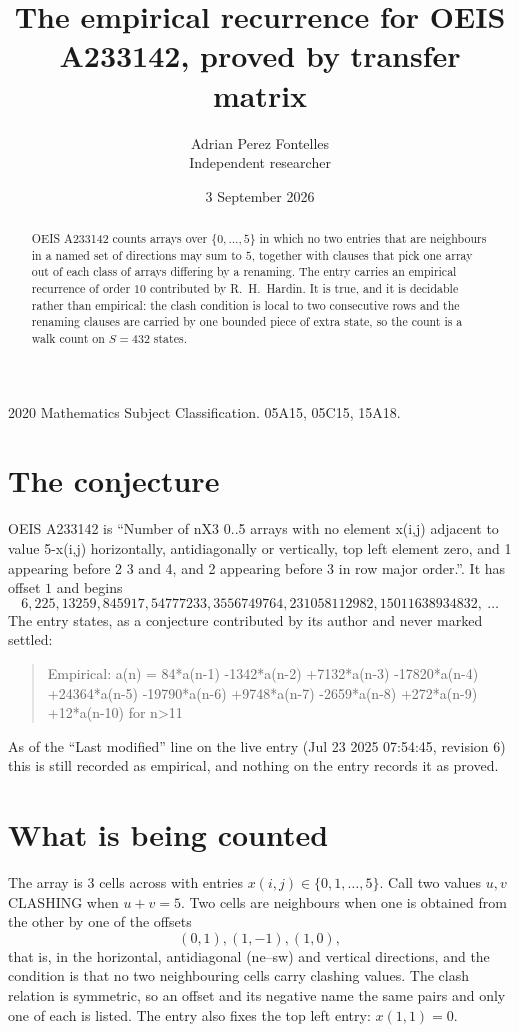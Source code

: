 \documentclass[11pt,a4paper]{article}
\title{The empirical recurrence for OEIS A233142, proved by transfer matrix}
\author{Adrian Perez Fontelles\\ \small Independent researcher}
\date{3 September 2026}
\theoremstyle{plain}
\theoremstyle{definition}
\begin{document}
\maketitle

\begin{abstract}
OEIS A233142 counts arrays over $\{0,\dots,5\}$ in which no two entries that are neighbours in
a named set of directions may sum to $5$, together with clauses that pick one array out of
each class of arrays differing by a renaming. The entry carries an empirical recurrence of
order $10$ contributed by R.~H.~Hardin. It is true, and it is decidable rather than
empirical: the clash condition is local to two consecutive rows and the renaming clauses are
carried by one bounded piece of extra state, so the count is a walk count on $S=432$ states.
\end{abstract}

\noindent\small 2020 Mathematics Subject Classification. 05A15, 05C15, 15A18.\normalsize

\section{The conjecture}

OEIS A233142 is ``Number of nX3 0..5 arrays with no element x(i,j) adjacent to value 5-x(i,j) horizontally, antidiagonally or vertically, top left element zero, and 1 appearing before 2 3 and 4, and 2 appearing before 3 in row major order.''. It has offset $1$ and begins
\[
6, 225, 13259, 845917, 54777233, 3556749764, 231058112982, 15011638934832,\ \dots
\]
The entry states, as a conjecture contributed by its author and never marked settled:
\begin{quote}
Empirical: a(n) = 84*a(n-1) -1342*a(n-2) +7132*a(n-3) -17820*a(n-4) +24364*a(n-5) -19790*a(n-6) +9748*a(n-7) -2659*a(n-8) +272*a(n-9) +12*a(n-10) for n>11
\end{quote}
As of the ``Last modified'' line on the live entry (Jul 23 2025 07:54:45, revision 6) this is still
recorded as empirical, and nothing on the entry records it as proved.

\section{What is being counted}

The array is $3$ cells across with entries $x(i,j)\in\{0,1,\dots,5\}$. Call two values $u,v$ CLASHING
when $u+v=5$. Two cells are neighbours when one is obtained from the other by one of
the offsets
\[
(0,1), (1,-1), (1,0),
\]
that is, in the horizontal, antidiagonal (ne--sw) and vertical directions, and the condition is that no two neighbouring cells carry
clashing values. The clash relation is symmetric, so an offset and its negative name the
same pairs and only one of each is listed. The entry also fixes the top left entry: $x(1,1)=0$.
\end{document}
